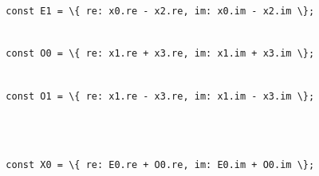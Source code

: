 \documentclass[
]{article}
\newcommand{\passthrough}[1]{#1}
\begin{document}
\passthrough{\lstinline!  !}\passthrough{\lstinline!const!}\passthrough{\lstinline! !}\passthrough{\lstinline!E1!}\passthrough{\lstinline! !}\passthrough{\lstinline!=!}\passthrough{\lstinline! !}\passthrough{\lstinline!\{!}\passthrough{\lstinline! !}\passthrough{\lstinline!re:!}\passthrough{\lstinline! !}\passthrough{\lstinline!x0.re!}\passthrough{\lstinline! !}\passthrough{\lstinline!-!}\passthrough{\lstinline! !}\passthrough{\lstinline!x2.re,!}\passthrough{\lstinline! !}\passthrough{\lstinline!im:!}\passthrough{\lstinline! !}\passthrough{\lstinline!x0.im!}\passthrough{\lstinline! !}\passthrough{\lstinline!-!}\passthrough{\lstinline! !}\passthrough{\lstinline!x2.im!}\passthrough{\lstinline! !}\passthrough{\lstinline!\};!}\strut \\
\passthrough{\lstinline!  !}\passthrough{\lstinline!const!}\passthrough{\lstinline! !}\passthrough{\lstinline!O0!}\passthrough{\lstinline! !}\passthrough{\lstinline!=!}\passthrough{\lstinline! !}\passthrough{\lstinline!\{!}\passthrough{\lstinline! !}\passthrough{\lstinline!re:!}\passthrough{\lstinline! !}\passthrough{\lstinline!x1.re!}\passthrough{\lstinline! !}\passthrough{\lstinline!+!}\passthrough{\lstinline! !}\passthrough{\lstinline!x3.re,!}\passthrough{\lstinline! !}\passthrough{\lstinline!im:!}\passthrough{\lstinline! !}\passthrough{\lstinline!x1.im!}\passthrough{\lstinline! !}\passthrough{\lstinline!+!}\passthrough{\lstinline! !}\passthrough{\lstinline!x3.im!}\passthrough{\lstinline! !}\passthrough{\lstinline!\};!}\strut \\
\passthrough{\lstinline!  !}\passthrough{\lstinline!const!}\passthrough{\lstinline! !}\passthrough{\lstinline!O1!}\passthrough{\lstinline! !}\passthrough{\lstinline!=!}\passthrough{\lstinline! !}\passthrough{\lstinline!\{!}\passthrough{\lstinline! !}\passthrough{\lstinline!re:!}\passthrough{\lstinline! !}\passthrough{\lstinline!x1.re!}\passthrough{\lstinline! !}\passthrough{\lstinline!-!}\passthrough{\lstinline! !}\passthrough{\lstinline!x3.re,!}\passthrough{\lstinline! !}\passthrough{\lstinline!im:!}\passthrough{\lstinline! !}\passthrough{\lstinline!x1.im!}\passthrough{\lstinline! !}\passthrough{\lstinline!-!}\passthrough{\lstinline! !}\passthrough{\lstinline!x3.im!}\passthrough{\lstinline! !}\passthrough{\lstinline!\};!}\strut \\
\strut \\
\passthrough{\lstinline!  !}\passthrough{\lstinline!const!}\passthrough{\lstinline! !}\passthrough{\lstinline!X0!}\passthrough{\lstinline! !}\passthrough{\lstinline!=!}\passthrough{\lstinline! !}\passthrough{\lstinline!\{!}\passthrough{\lstinline! !}\passthrough{\lstinline!re:!}\passthrough{\lstinline! !}\passthrough{\lstinline!E0.re!}\passthrough{\lstinline! !}\passthrough{\lstinline!+!}\passthrough{\lstinline! !}\passthrough{\lstinline!O0.re,!}\passthrough{\lstinline! !}\passthrough{\lstinline!im:!}\passthrough{\lstinline! !}\passthrough{\lstinline!E0.im!}\passthrough{\lstinline! !}\passthrough{\lstinline!+!}\passthrough{\lstinline! !}\passthrough{\lstinline!O0.im!}\passthrough{\lstinline! !}\passthrough{\lstinline!\};!}\strut \\
\end{document}
